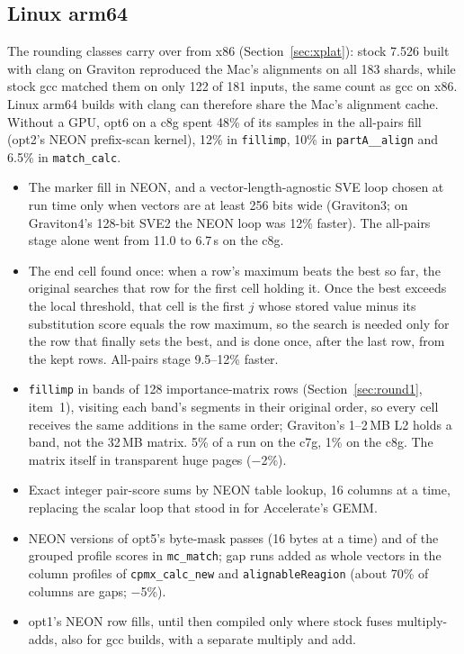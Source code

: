\documentclass[11pt]{article}
\newcommand{\code}[1]{\texttt{#1}}
\begin{document}
\subsection{Linux arm64}

The rounding classes carry over from x86 (Section~\ref{sec:xplat}): stock 7.526 built with
clang on Graviton reproduced the Mac's alignments on all 183 shards, while stock gcc matched
them on only 122 of 181 inputs, the same count as gcc on x86. Linux arm64 builds with clang can
therefore share the Mac's alignment cache. Without a GPU, opt6 on a c8g spent 48\% of its
samples in the all-pairs fill (opt2's NEON prefix-scan kernel), 12\% in \code{fillimp}, 10\% in
\code{partA\_\_align} and 6.5\% in \code{match\_calc}.

\begin{itemize}
\item The marker fill in NEON, and a vector-length-agnostic SVE loop chosen at run time only
  when vectors are at least 256 bits wide (Graviton3; on Graviton4's 128-bit SVE2 the NEON loop
  was 12\% faster). The all-pairs stage alone went from 11.0 to 6.7\,s on the c8g.
\item The end cell found once: when a row's maximum beats the best so far, the original
  searches that row for the first cell holding it. Once the best exceeds the local threshold,
  that cell is the first $j$ whose stored value minus its substitution score equals the row
  maximum, so the search is needed only for the row that finally sets the best, and is done
  once, after the last row, from the kept rows. All-pairs stage 9.5--12\% faster.
\item \code{fillimp} in bands of 128 importance-matrix rows (Section~\ref{sec:round1}, item~1),
  visiting each band's segments in their original order, so every cell receives the same
  additions in the same order; Graviton's 1--2\,MB L2 holds a band, not the 32\,MB matrix. 5\%
  of a run on the c7g, 1\% on the c8g. The matrix itself in transparent huge pages ($-$2\%).
\item Exact integer pair-score sums by NEON table lookup, 16 columns at a time, replacing the
  scalar loop that stood in for Accelerate's GEMM.
\item NEON versions of opt5's byte-mask passes (16 bytes at a time) and of the grouped profile
  scores in \code{mc\_match}; gap runs added as whole vectors in the column profiles of
  \code{cpmx\_calc\_new} and \code{alignableReagion} (about 70\% of columns are gaps; $-$5\%).
\item opt1's NEON row fills, until then compiled only where stock fuses multiply-adds, also for
  gcc builds, with a separate multiply and add.
\end{itemize}
\end{document}

